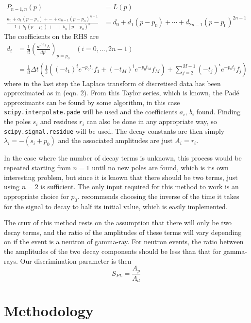 \documentclass[11pt]{article}
\numberwithin{equation}{section}
\numberwithin{figure}{section}
\numberwithin{table}{section}
\begin{document}
\begin{align}
    P_{n-1,n}(p)&=L(p)\\
    \frac{a_0+a_1(p-p_0)+\dotsi+a_{n-1}(p-p_0)^{n-1}}{1+b_1(p-p_0)+\dotsi+b_n(p-p_0)^n}&=d_0+d_1(p-p_0)+\dotsi+d_{2n-1}(p-p_0)^{2n-1}\label{eqn:pade approximant}
\end{align}
The coefficients on the RHS are 
\begin{align}
    d_i&=\frac{1}{i!}\left(\frac{d^{(i)}L}{dp^{i}}\right)_{p=p_0}\;\;\;(i=0,\dots,2n-1)\\
    &=\frac{1}{i!}\Delta t\left(\frac{1}{2}((-t_1)^ie^{-p_0t_1}f_1+(-t_M)^ie^{-p_0t_M}f_M)+\sum_{j=2}^{M-1}(-t_j)^ie^{-p_0t_j}f_j \right)
\end{align}
where in the last step the Laplace transform of discretised data has been approximated as in \cite{Hellen-Pade} (eqn. 2). From this Taylor series, which is known, the Pad\'e approximants can be found by some algorithm, in this case \texttt{scipy.interpolate.pade} will be used and the coefficients $a_i,\, b_i$ found. Finding the poles $s_i$ and residues $r_i$ can also be done in any appropriate way, so \texttt{scipy.signal.residue} will be used. The decay constants are then simply $\lambda_i=-(s_i+p_0)$ and the associated amplitudes are just $A_i=r_i$.
\par In the case where the number of decay terms is unknown, this process would be repeated starting from $n=1$ until no new poles are found, which is its own interesting problem, but since it is known that there should be two terms, just using $n=2$ is sufficient. The only input required for this method to work is an appropriate choice for $p_0$. \cite{Hellen-Pade} recommends choosing the inverse of the time it takes for the signal to decay to half its initial value, which is easily implemented. 
\par The crux of this method rests on the assumption that there will only be two decay terms, and the ratio of the amplitudes of these terms will vary depending on if the event is a neutron of gamma-ray. For neutron events, the ratio between the amplitudes of the two decay components should be less than that for gamma-rays. Our discrimination parameter is then
\begin{equation}
    S_{PL}=\frac{A_p}{A_d}
    \label{eqn:PL parameter}
\end{equation}

\section{Methodology}\label{sec:Methodology}
\end{document}
